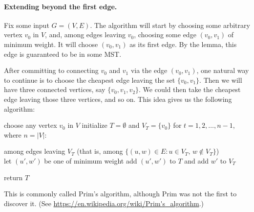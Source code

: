 
\paragraph{Extending beyond the first edge.}
Fix some input $G=(V,E)$.
The algorithm will start
by choosing some arbitrary vertex $v_0$ in $V$,
and, among edges leaving $v_0$, choosing some edge $(v_0, v_1)$ of minimum weight.
It will choose $(v_0, v_1)$ as its first edge.
By the lemma, this edge is guaranteed to be in some MST.

After committing to connecting $v_0$ and $v_1$ via the edge $(v_0, v_1)$,
one natural way to continue is to choose the cheapest edge leaving the set $\{v_0, v_1\}$.
Then we will have three connected vertices, say $\{v_0, v_1, v_2\}$.
We could then take the cheapest edge leaving those three vertices, and so on.
This idea gives us the following algorithm:

\begin{myframed}
  \begin{steps}
  \item[{{\sf Prim}$(G=(V,E))$:}]
    \step choose any vertex $v_0$ in $V$
    \step initialize $T=\emptyset$ and $V_T = \{v_0\}$
    \step for $t=1,2,\ldots,n-1$, where $n=|V|$:
    \begin{block}
      \step among edges leaving $V_T$ (that is, among $\{(u,w)\in E : u\in V_T,\,w\not\in V_T\}$)
      \\\hspace*{3em} let $(u',w')$ be one of minimum weight
      \step add $(u', w')$ to $T$ and add $w'$ to $V_T$
    \end{block}
    \step return $T$
  \end{steps}
\end{myframed}

This is commonly called Prim's algorithm,
although Prim was not the first to discover it.
(See \url{https://en.wikipedia.org/wiki/Prim's_algorithm}.)

